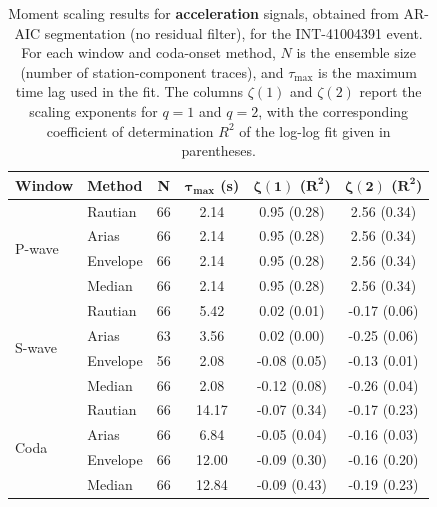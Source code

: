 \begin{table}[H]
\centering
\small
\begin{tabular}{llcccc}
\toprule
\textbf{Window} & \textbf{Method} & \textbf{N} & $\bm{\tau_{\max}}$ \textbf{(s)} & $\bm{\zeta(1)}$ \textbf{(}$\bm{R^2}$\textbf{)} & $\bm{\zeta(2)}$ \textbf{(}$\bm{R^2}$\textbf{)} \\
\midrule
\multirow{4}{*}{P-wave}
& Rautian & 66 & 2.14 & 0.95 (0.28) & 2.56 (0.34) \\
& Arias & 66 & 2.14 & 0.95 (0.28) & 2.56 (0.34) \\
& Envelope & 66 & 2.14 & 0.95 (0.28) & 2.56 (0.34) \\
& Median & 66 & 2.14 & 0.95 (0.28) & 2.56 (0.34) \\
\midrule
\multirow{4}{*}{S-wave}
& Rautian & 66 & 5.42 & 0.02 (0.01) & -0.17 (0.06) \\
& Arias & 63 & 3.56 & 0.02 (0.00) & -0.25 (0.06) \\
& Envelope & 56 & 2.08 & -0.08 (0.05) & -0.13 (0.01) \\
& Median & 66 & 2.08 & -0.12 (0.08) & -0.26 (0.04) \\
\midrule
\multirow{4}{*}{Coda}
& Rautian & 66 & 14.17 & -0.07 (0.34) & -0.17 (0.23) \\
& Arias & 66 & 6.84 & -0.05 (0.04) & -0.16 (0.03) \\
& Envelope & 66 & 12.00 & -0.09 (0.30) & -0.16 (0.20) \\
& Median & 66 & 12.84 & -0.09 (0.43) & -0.19 (0.23) \\
\bottomrule
\end{tabular}
\caption{Moment scaling results for \textbf{acceleration} signals, obtained from AR-AIC segmentation (no residual filter), for the INT-41004391 event. For each window and coda-onset method, $N$ is the ensemble size (number of station-component traces), and $\tau_{\max}$ is the maximum time lag used in the fit. The columns $\zeta(1)$ and $\zeta(2)$ report the scaling exponents for $q=1$ and $q=2$, with the corresponding coefficient of determination $R^2$ of the log-log fit given in parentheses.}
\label{tab:ar_aic_scaling_acc_nothresh_queyras}
\end{table}